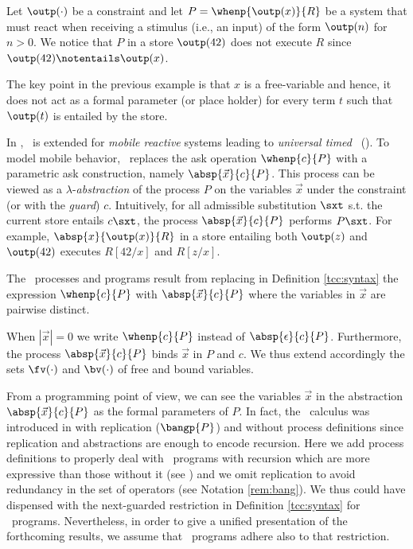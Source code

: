 \documentclass{tlp}
\begin{document}
\begin{example}
Let  $\outp(\cdot)$ be a constraint and let  $P=\whenp{\outp(x)}{R}$
be 
 a system that must react when receiving a stimulus (i.e., an input) of the form
$\outp(n)$ for $n>0$.   We notice that   $P$ in a store $\outp(42)$ 
does not execute $R$ since   $\outp(42)\notentails \outp(x)$. 
\end{example}


The key point in the previous example  is that $x$ is a free-variable and
hence,  it  does not act as a formal parameter (or place holder) for every
term $t$  such that $\outp(t)$ is entailed by the store. 




In  \cite{Olarte:08:SAC}, \tccp\ is extended for \emph{mobile
reactive} systems leading to  \emph{universal timed} \ccp\   (\utcc).
To model mobile behavior,  \utcc\  replaces the  ask operation
$\whenp{c}{P}$ with a   parametric ask construction,
namely $\absp{\vec{x}}{c}{P}$.  This process can be viewed as a
$\lambda$-\emph{abstraction} of the process $P$ on the variables
$\vec{x}$ under the constraint (or with the \emph{guard}) $c$.
Intuitively, for all admissible substitution $\sxt$ s.t. the current store entails $c\sxt$, the process  $\absp{\vec{x}}{c}{P} $ performs $P\sxt $. For example, $\absp{x}{\outp(x)}{R}$   in a store entailing both $\outp(z)$ and $\outp(42)$  executes $R[42/x]$ and $R[z/x]$. 
 
\begin{definition}\label{utcc:syntax}
 The \utcc\ processes and programs result from replacing in  
Definition \ref{tcc:syntax} the expression $\whenp{c}{P}$ with 
$\absp{\vec{x}}{c}{P}$ where the variables in $\vec{x}$ are pairwise distinct. 
\end{definition}

  When
$|\vec{x}|=0$ we  write $\whenp{c}{P}$ instead of
$\absp{\epsilon}{c}{P}$.  
Furthermore, the process $\absp{\vec{x}}{c}{P} $ binds $\vec{x}$ in $P$ and $c$. We thus extend accordingly the sets $\fv(\cdot)$ and $\bv(\cdot)$ of free and bound variables.  



 From a programming point of view,  we can see the variables
$\vec{x}$ in the abstraction $\absp{\vec{x}}{c}{P}$ as the formal
parameters of    $P$. In fact, 
the \utcc\ calculus was introduced in  \cite{Olarte:08:SAC}  
with replication ($\bangp{P}$) and 
without process definitions since replication and abstractions are enough to encode recursion. 
Here we add process definitions to properly deal with  \tccp\ programs with
recursion which are more expressive than those without it (see
\cite{DBLP:conf/ppdp/NielsenPV02}) and we omit replication to avoid
redundancy in the set of operators (see Notation \ref{rem:bang}). 
We thus could have  dispensed with the next-guarded restriction in Definition \ref{tcc:syntax} for  \utcc\ programs. Nevertheless,  in order to give a unified presentation of the forthcoming results, we assume that  \utcc\ programs adhere also to that restriction.
\end{document}
